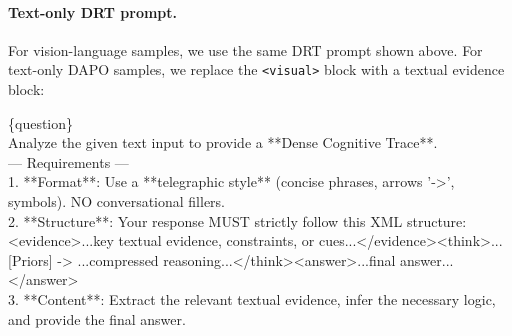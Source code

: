 \paragraph{Text-only DRT prompt.}
For vision-language samples, we use the same DRT prompt shown above.
For text-only DAPO samples, we replace the \texttt{<visual>} block with a textual evidence block:

\begin{promptbox}
\{question\}\\
Analyze the given text input to provide a **Dense Cognitive Trace**.\\
--- Requirements ---\\
1. **Format**: Use a **telegraphic style** (concise phrases, arrows '-\textgreater{}', symbols). NO conversational fillers.\\
2. **Structure**: Your response MUST strictly follow this XML structure:\\
\textless{}evidence\textgreater{}...key textual evidence, constraints, or cues...\textless{}/evidence\textgreater{}\textless{}think\textgreater{}...[Priors] -\textgreater{} ...compressed reasoning...\textless{}/think\textgreater{}\textless{}answer\textgreater{}...final answer...\textless{}/answer\textgreater{}\\
3. **Content**: Extract the relevant textual evidence, infer the necessary logic, and provide the final answer.
\end{promptbox}


